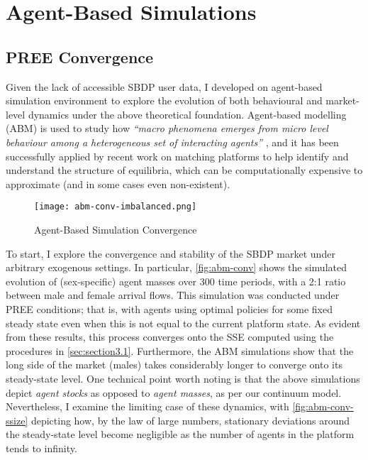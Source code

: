 \section{Agent-Based Simulations}
\label{sec:section4}  
\subsection{PREE Convergence}
Given the lack of accessible SBDP user data, I developed on agent-based simulation environment to explore the evolution of both behavioural and market-level dynamics under the above theoretical foundation. 
Agent-based modelling (ABM) is used to study how \textit{``macro phenomena emerges from micro level behaviour among a heterogeneous set of interacting agents''} \citep{janssen2005agent}, and it has been successfully applied by recent work on matching platforms \citep{immorlica2021designing} to help identify and understand the structure of equilibria, which can be computationally expensive to approximate (and in some cases even non-existent).

\begin{figure}[ht]
    \centering
    \caption{Agent-Based Simulation Convergence}
    \texttt{[image: abm-conv-imbalanced.png]}
    \label{fig:abm-conv} 
\end{figure}

To start, I explore the convergence and stability of the SBDP market under arbitrary exogenous settings. In particular, \autoref{fig:abm-conv} shows the simulated evolution of (sex-specific) agent masses over 300 time periods, with a 2:1 ratio between male and female arrival flows. This simulation was conducted under PREE conditions; that is, with agents using optimal policies for some fixed steady state even when this is not equal to the current platform state.  
As evident from these results, this process converges onto the SSE computed using the procedures in \autoref{sec:section3.1}. Furthermore, the ABM simulations show that the long side of the market (males) takes considerably longer to converge onto its steady-state level. One technical point worth noting is that the above simulations depict \textit{agent stocks} as opposed to \textit{agent masses}, as per our continuum model. %
Nevertheless, I examine the limiting case of these dynamics, with \autoref{fig:abm-conv-ssize} depicting how, by the law of large numbers, stationary deviations around the steady-state level become negligible as the number of agents in the platform tends to infinity. 

